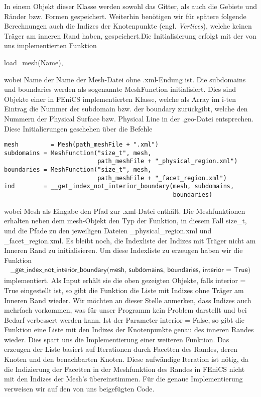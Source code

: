 In einem Objekt dieser Klasse werden sowohl das Gitter, als auch die Gebiete und Ränder bzw. Formen gespeichert. Weiterhin benötigen wir für spätere folgende Berechnungen auch die Indizes der Knotenpunkte (engl. \textit{Vertices}), welche keinen Träger am inneren Rand haben, gespeichert.Die Initialisierung erfolgt mit der von uns implementierten Funktion 
\begin{center}
\textsf{load\_mesh(Name)},
\end{center} wobei \textsf{Name} der Name der Mesh-Datei ohne \textsf{.xml}-Endung ist. Die \textsf{subdomains} und \textsf{boundaries} werden als sogenannte \textsf{MeshFunction} initialisiert. Dies sind Objekte einer in FEniCS implementierten Klasse, welche als Array im \textsf{i}-ten Eintrag die Nummer der \textsf{subdomain} bzw. der \textsf{boundary} zurückgibt, welche den Nummern der \textsf{Physical Surface} bzw. \textsf
{Physical Line}  in der \textsf{.geo}-Datei entsprechen. Diese Initialierungen geschehen über die Befehle

\begin{lstlisting}
mesh 	     = Mesh(path_meshFile + ".xml")
subdomains = MeshFunction("size_t", mesh,
                          path_meshFile + "_physical_region.xml")
boundaries = MeshFunction("size_t", mesh, 
                          path_meshFile + "_facet_region.xml")
ind        = __get_index_not_interior_boundary(mesh, subdomains, 
                                               boundaries)  
\end{lstlisting}
wobei \textsf{Mesh} als Eingabe den Pfad zur \textsf{.xml}-Datei enthält. Die Meshfunktionen erhalten neben dem \textsf{mesh}-Objekt den Typ der Funktion, in diesem Fall \textsf{size\_t}, und die Pfade zu den jeweiligen Dateien \textsf{\_physical\_region.xml} und \textsf{\_facet\_region.xml}. Es bleibt noch, die Indexliste der Indizes mit Träger nicht am Inneren Rand zu initialisieren. Um diese Indexliste zu erzeugen haben wir die Funktion 
\begin{align*}
\textsf{\_\_get\_index\_not\_interior\_boundary(mesh, subdomains, 
boundaries, interior = True)}  
\end{align*}
implementiert. Als Input erhält sie die oben gezeigten Objekte, falls \textsf{interior = True} eingestellt ist, so gibt die Funktion die Liste mit Indizes ohne Träger am Inneren Rand wieder. Wir möchten an dieser Stelle anmerken, dass Indizes auch mehrfach vorkommen, was für unser Programm kein Problem darstellt und bei Bedarf verbessert werden kann. Ist der Parameter \textsf{interior = False}, so gibt die Funktion eine Liste mit den Indizes der Knotenpunkte genau des inneren Randes wieder. Dies spart uns die Implementierung einer weiteren Funktion. Das erzeugen der Liste basiert auf Iterationen durch Facetten des Randes, deren Knoten und den benachbarten Knoten. Diese aufwändige Iteration ist nötig, da die Indizierung der Facetten in der Meshfunktion des Randes in FEniCS nicht mit den Indizes der Mesh's übereinstimmen. Für die genaue Implementierung verweisen wir auf den von uns beigefügten Code. 


